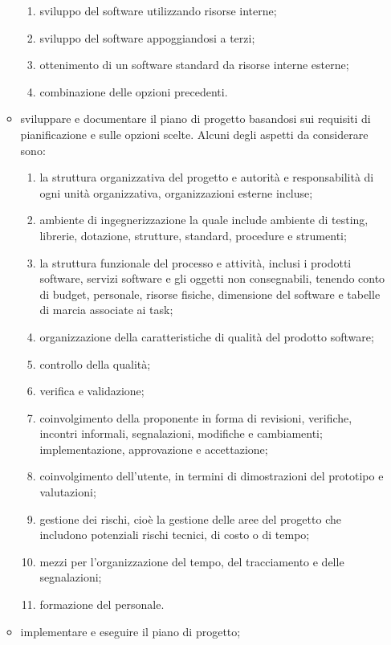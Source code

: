 \begin{itemize}
\begin{itemize}
\begin{enumerate}
\item sviluppo del software utilizzando risorse interne;
\item sviluppo del software appoggiandosi a terzi;
\item ottenimento di un software standard da risorse interne esterne;
\item combinazione delle opzioni precedenti.
\end{enumerate}

\item sviluppare e documentare il piano di progetto basandosi sui requisiti di pianificazione e sulle opzioni scelte. Alcuni degli aspetti da considerare sono:

\begin{enumerate}
\item la struttura organizzativa del progetto e autorità e responsabilità di ogni unità organizzativa, organizzazioni esterne incluse;
\item ambiente di ingegnerizzazione la quale include ambiente di testing, librerie, dotazione, strutture, standard, procedure e strumenti;
\item la struttura funzionale del processo e attività, inclusi i prodotti software, servizi software e gli oggetti non consegnabili, tenendo conto di budget, personale, risorse fisiche, dimensione del software e tabelle di marcia associate ai task;
\item organizzazione della caratteristiche di qualità del prodotto software;
\item controllo della qualità;
\item verifica e validazione;
\item coinvolgimento della proponente in forma di revisioni, verifiche, incontri informali, segnalazioni, modifiche e cambiamenti; implementazione, approvazione e accettazione;
\item coinvolgimento dell'utente, in termini di dimostrazioni del prototipo e valutazioni;
\item gestione dei rischi, cioè la gestione delle aree del progetto che includono potenziali rischi tecnici, di costo o di tempo;
\item mezzi per l'organizzazione del tempo, del tracciamento e delle segnalazioni;
\item formazione del personale.     
\end{enumerate}
\item implementare e eseguire il piano di progetto;

\end{itemize}
\end{itemize}
